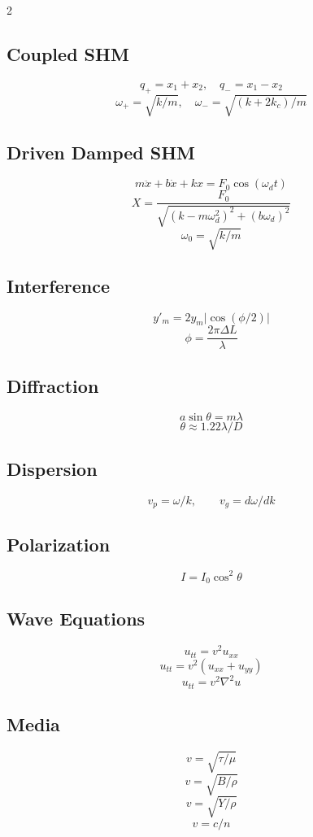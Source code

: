 \documentclass{studentnotes}
\begin{document}
\begin{multicols}{2}

\subsection*{Coupled SHM}
\[
    q_+=x_1+x_2,\quad q_-=x_1-x_2
\]
\[
    \omega_+=\sqrt{k/m},
    \quad
    \omega_-=\sqrt{(k+2k_c)/m}
\]

\subsection*{Driven Damped SHM}
\[
    m\ddot{x}+b\dot{x}+kx=F_0\cos(\omega_d t)
\]
\[
    X=
    \frac{F_0}{\sqrt{(k-m\omega_d^2)^2+(b\omega_d)^2}}
\]
\[
    \omega_0=\sqrt{k/m}
\]

\subsection*{Interference}
\[
    y'_m=2y_m\left|\cos(\phi/2)\right|
\]
\[
    \phi=\frac{2\pi\Delta L}{\lambda}
\]

\subsection*{Diffraction}
\[
    a\sin\theta=m\lambda
\]
\[
    \theta\approx1.22\lambda/D
\]

\subsection*{Dispersion}
\[
    v_p=\omega/k,
    \qquad
    v_g=d\omega/dk
\]

\subsection*{Polarization}
\[
    I=I_0\cos^2\theta
\]

\subsection*{Wave Equations}
\[
    u_{tt}=v^2u_{xx}
\]
\[
    u_{tt}=v^2(u_{xx}+u_{yy})
\]
\[
    u_{tt}=v^2\nabla^2u
\]

\subsection*{Media}
\[
    v=\sqrt{\tau/\mu}
\]
\[
    v=\sqrt{B/\rho}
\]
\[
    v=\sqrt{Y/\rho}
\]
\[
    v=c/n
\]

\end{multicols}
\end{document}
